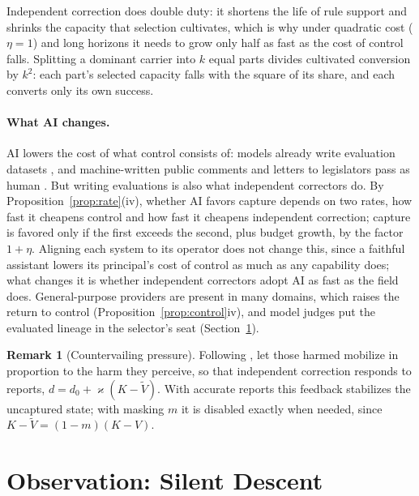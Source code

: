 \documentclass[letterpaper]{article} %
\theoremstyle{definition}
\newtheorem{remark}{Remark}
\begin{document}
Independent correction does double duty: it shortens the life of rule support and shrinks the capacity that selection cultivates, which is why under quadratic cost ($\eta=1$) and long horizons it needs to grow only half as fast as the cost of control falls. Splitting a dominant carrier into $k$ equal parts divides cultivated conversion by $k^2$: each part's selected capacity falls with the square of its share, and each converts only its own success.

\paragraph{What AI changes.} AI lowers the cost of what control consists of: models already write evaluation datasets \citep{perez2023}, and machine-written public comments and letters to legislators pass as human \citep{weiss2019,kreps2024}. But writing evaluations is also what independent correctors do. By Proposition~\ref{prop:rate}(iv), whether AI favors capture depends on two rates, how fast it cheapens control and how fast it cheapens independent correction; capture is favored only if the first exceeds the second, plus budget growth, by the factor $1+\eta$. Aligning each system to its operator does not change this, since a faithful assistant lowers its principal's cost of control as much as any capability does; what changes it is whether independent correctors adopt AI as fast as the field does. General-purpose providers are present in many domains, which raises the return to control (Proposition~\ref{prop:control}iv), and model judges put the evaluated lineage in the selector's seat (Section~\ref{sec:silent}).

\begin{remark}[Countervailing pressure]\label{rem:becker}
Following \citet{becker1983}, let those harmed mobilize in proportion to the harm they perceive, so that independent correction responds to reports, $d=d_0+\varkappa(K-\tilde V)$. With accurate reports this feedback stabilizes the uncaptured state; with masking $m$ it is disabled exactly when needed, since $K-\tilde V=(1-m)(K-V)$.
\end{remark}

\section{Observation: Silent Descent}\label{sec:silent}
\end{document}
